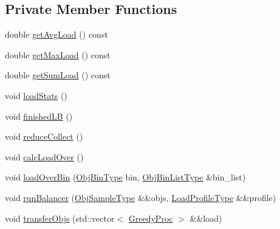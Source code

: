 \subsection*{Private Member Functions}
\begin{DoxyCompactItemize}
\item 
double \hyperlink{structvt_1_1vrt_1_1collection_1_1lb_1_1_greedy_l_b_a7c270ad22c0dcc393a6d65c1abe2473d}{get\+Avg\+Load} () const
\item 
double \hyperlink{structvt_1_1vrt_1_1collection_1_1lb_1_1_greedy_l_b_a42b333d301096e303095736507c88b37}{get\+Max\+Load} () const
\item 
double \hyperlink{structvt_1_1vrt_1_1collection_1_1lb_1_1_greedy_l_b_a2e9f213874f7eecc81a09f2b1ceb5291}{get\+Sum\+Load} () const
\item 
void \hyperlink{structvt_1_1vrt_1_1collection_1_1lb_1_1_greedy_l_b_a1d746659b257bc6897976b23deda3f2e}{load\+Stats} ()
\item 
void \hyperlink{structvt_1_1vrt_1_1collection_1_1lb_1_1_greedy_l_b_aaee35fa972c887604c1061d5e73c0380}{finished\+LB} ()
\item 
void \hyperlink{structvt_1_1vrt_1_1collection_1_1lb_1_1_greedy_l_b_afbb460b759e33f8f6e703858d4457cad}{reduce\+Collect} ()
\item 
void \hyperlink{structvt_1_1vrt_1_1collection_1_1lb_1_1_greedy_l_b_a781bd4f7f52451094a9541447ad70d0c}{calc\+Load\+Over} ()
\item 
void \hyperlink{structvt_1_1vrt_1_1collection_1_1lb_1_1_greedy_l_b_a2eebe9945964c405c237ae025d901c93}{load\+Over\+Bin} (\hyperlink{structvt_1_1vrt_1_1collection_1_1lb_1_1_load_sampler_base_l_b_acb55af31b27a3c248d351189abd78487}{Obj\+Bin\+Type} bin, \hyperlink{structvt_1_1vrt_1_1collection_1_1lb_1_1_load_sampler_base_l_b_a58de8f1e1204cf52b661b3906e2d9eeb}{Obj\+Bin\+List\+Type} \&bin\+\_\+list)
\item 
void \hyperlink{structvt_1_1vrt_1_1collection_1_1lb_1_1_greedy_l_b_a1d99110d1226a5f843aab375e2949b7a}{run\+Balancer} (\hyperlink{structvt_1_1vrt_1_1collection_1_1lb_1_1_load_sampler_base_l_b_a8d939a849ec0d6371c1c4d441ffb9b94}{Obj\+Sample\+Type} \&\&objs, \hyperlink{structvt_1_1vrt_1_1collection_1_1lb_1_1_greedy_l_b_a3db2c9b36ac99ed4aed38519be4aad60}{Load\+Profile\+Type} \&\&profile)
\item 
void \hyperlink{structvt_1_1vrt_1_1collection_1_1lb_1_1_greedy_l_b_a329b105a21240dd33a53d06080b035da}{transfer\+Objs} (std\+::vector$<$ \hyperlink{structvt_1_1vrt_1_1collection_1_1lb_1_1_greedy_proc}{Greedy\+Proc} $>$ \&\&load)

\end{DoxyCompactItemize}

